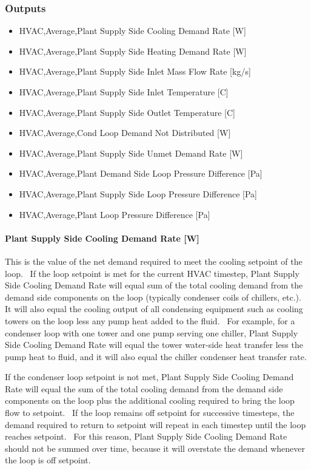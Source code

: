 \subsubsection{Outputs}\label{outputs-1-018}

\begin{itemize}
\item
  HVAC,Average,Plant Supply Side Cooling Demand Rate {[}W{]}
\item
  HVAC,Average,Plant Supply Side Heating Demand Rate {[}W{]}
\item
  HVAC,Average,Plant Supply Side Inlet Mass Flow Rate {[}kg/s{]}
\item
  HVAC,Average,Plant Supply Side Inlet Temperature {[}C{]}
\item
  HVAC,Average,Plant Supply Side Outlet Temperature {[}C{]}
\item
  HVAC,Average,Cond Loop Demand Not Distributed {[}W{]}
\item
  HVAC,Average,Plant Supply Side Unmet Demand Rate {[}W{]}
\item
  HVAC,Average,Plant Demand Side Loop Pressure Difference {[}Pa{]}
\item
  HVAC,Average,Plant Supply Side Loop Pressure Difference {[}Pa{]}
\item
  HVAC,Average,Plant Loop Pressure Difference {[}Pa{]}
\end{itemize}

\paragraph{Plant Supply Side Cooling Demand Rate {[}W{]}}\label{plant-supply-side-cooling-demand-rate-w-1}

This is the value of the net demand required to meet the cooling setpoint of the loop.~ If the loop setpoint is met for the current HVAC timestep, Plant Supply Side Cooling Demand Rate will equal sum of the total cooling demand from the demand side components on the loop (typically condenser coils of chillers, etc.).~ It will also equal the cooling output of all condensing equipment such as cooling towers on the loop less any pump heat added to the fluid.~ For example, for a condenser loop with one tower and one pump serving one chiller, Plant Supply Side Cooling Demand Rate will equal the tower water-side heat transfer less the pump heat to fluid, and it will also equal the chiller condenser heat transfer rate.

If the condenser loop setpoint is not met, Plant Supply Side Cooling Demand Rate will equal the sum of the total cooling demand from the demand side components on the loop plus the additional cooling required to bring the loop flow to setpoint.~ If the loop remains off setpoint for successive timesteps, the demand required to return to setpoint will repeat in each timestep until the loop reaches setpoint.~ For this reason, Plant Supply Side Cooling Demand Rate should not be summed over time, because it will overstate the demand whenever the loop is off setpoint.

